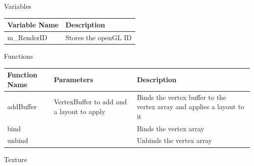 \documentclass{article}
\begin{document}
                \begin{center}
                    Variables
                    \begin{tabular}{ | m{} | m{} | }
                        \hline
                        \textbf{Variable Name} & \textbf{Description} \\
                        \hline
                        m\_RenderID & Stores the openGL ID \\
                        \hline
                    \end{tabular}
                    Functions
                    \begin{tabular}{ | m{} | m{}| m{} | }
                        \hline
                        \textbf{Function Name} & \textbf{Parameters} & \textbf{Description} \\
                        \hline
                        addBuffer & VertexBuffer to add and a layout to apply & Binds the vertex buffer to the vertex array and applies a layout to it \\
                        \hline
                        bind & & Binds the vertex array \\
                        \hline
                        unbind & & Unbinds the vertex array \\
                        \hline
                    \end{tabular}
                \end{center}
                Texture
\end{document}
